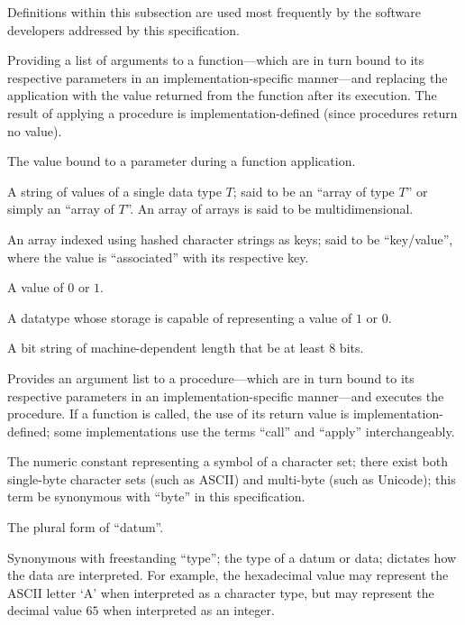 %

Definitions within this subsection are used most frequently by the software
developers addressed by this specification.

\begin{description}
  Providing a list of arguments to a function---which are in turn bound to its
  respective parameters in an implementation-specific manner---and replacing the
  application with the value returned from the function after its execution. The
  result of applying a procedure is implementation-defined (since procedures
  return no value).

  The value bound to a parameter during a function application.

  A string of values of a single data type $T$; said to be an ``array of type
  $T$'' or simply an ``array of $T$''. An array of arrays is said to be
  multidimensional.

  An array indexed using hashed character strings as keys; said to be
  ``key/value'', where the value is ``associated'' with its respective key.

  A value of $0$ or $1$.

  A datatype whose storage is capable of representing a value of $1$ or $0$.

  A bit string of machine-dependent length that \shall be at least $8$ bits.

  Provides an argument list to a procedure---which are in turn bound to its
  respective parameters in an implementation-specific manner---and executes the
  procedure. If a function is called, the use of its return value is
  implementation-defined; some implementations use the terms ``call'' and
  ``apply'' interchangeably.

  The numeric constant representing a symbol of a character set; there exist
  both single-byte character sets (such as ASCII) and multi-byte (such as
  Unicode); this term \shallnot be synonymous with ``byte'' in this
  specification.

  The plural form of ``datum''.

  Synonymous with freestanding ``type''; the type of a datum or data; dictates
  how the data are interpreted. For example, the hexadecimal value  may
  represent the ASCII letter `A' when interpreted as a character type, but may
  represent the decimal value $65$ when interpreted as an integer.


\end{description}
